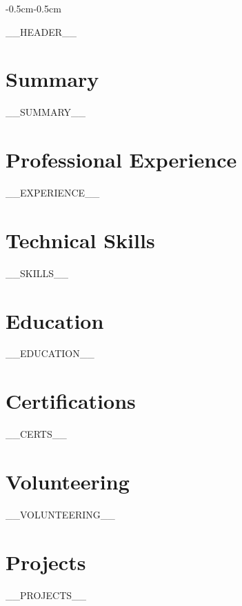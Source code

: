\documentclass[11pt,a4paper]{article}
\begin{document}
\begin{adjustwidth}{-0.5cm}{-0.5cm}
\begin{center}
__HEADER__
\end{center}
\end{adjustwidth}

\section*{Summary}
__SUMMARY__

\section*{Professional Experience}
__EXPERIENCE__

\section*{Technical Skills}
__SKILLS__

\section*{Education}
__EDUCATION__

\section*{Certifications}
__CERTS__

\section*{Volunteering}
__VOLUNTEERING__

\section*{Projects}
__PROJECTS__
\end{document}
